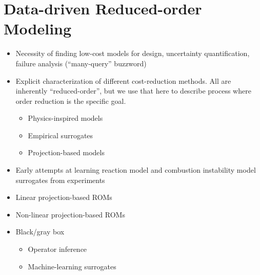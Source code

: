 \section{Data-driven Reduced-order Modeling}

\begin{itemize}
    \item Necessity of finding low-cost models for design, uncertainty quantification, failure analysis (``many-query'' buzzword)
    \item Explicit characterization of different cost-reduction methods. All are inherently ``reduced-order'', but we use that here to describe process where order reduction is the specific goal.
    \begin{itemize}
        \item Physics-inspired models
        \item Empirical surrogates
        \item Projection-based models
    \end{itemize}
    \item Early attempts at learning reaction model and combustion instability model surrogates from experiments
    \item Linear projection-based ROMs
    \item Non-linear projection-based ROMs
    \item Black/gray box
    \begin{itemize}
        \item Operator inference
        \item Machine-learning surrogates
    \end{itemize}
\end{itemize}